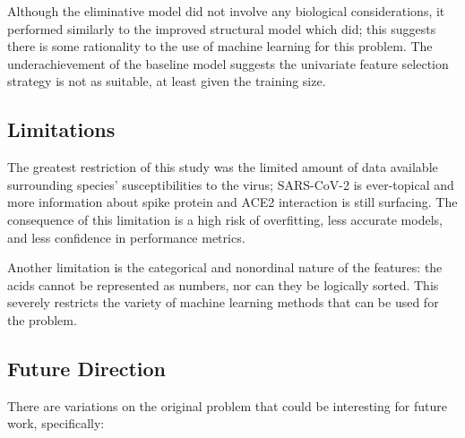 Although the eliminative model did not involve any biological considerations, it performed similarly to the improved structural model which did; this suggests there is some rationality to the use of machine learning for this problem. The underachievement of the baseline model suggests the univariate feature selection strategy is not as suitable, at least given the training size.

\subsection{Limitations}

The greatest restriction of this study was the limited amount of data available surrounding species’ susceptibilities to the virus; SARS-CoV-2 is ever-topical and more information about spike protein and ACE2 interaction is still surfacing. The consequence of this limitation is a high risk of overfitting, less accurate models, and less confidence in performance metrics.

Another limitation is the categorical and nonordinal nature of the features: the acids cannot be represented as numbers, nor can they be logically sorted. This severely restricts the variety of machine learning methods that can be used for the problem.

\subsection{Future Direction}

There are variations on the original problem that could be interesting for future work, specifically:

